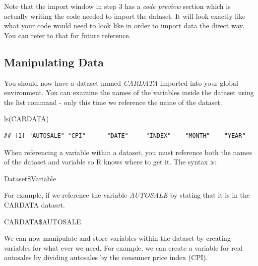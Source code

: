 \documentclass[
]{book}
\newenvironment{Shaded}{\begin{snugshade}}{\end{snugshade}}
\newcommand{\FunctionTok}[1]{\textcolor[rgb]{0.00,0.00,0.00}{#1}}
\newcommand{\NormalTok}[1]{#1}
\newcommand{\OtherTok}[1]{\textcolor[rgb]{0.56,0.35,0.01}{#1}}
\newcommand{\SpecialCharTok}[1]{\textcolor[rgb]{0.00,0.00,0.00}{#1}}
\begin{document}
Note that the import window in step 3 has a \emph{code preview} section which is actually writing the code needed to import the dataset. It will look exactly like what your code would need to look like in order to import data the direct way. You can refer to that for future reference.

\hypertarget{manipulating-data}{%
\subsection{Manipulating Data}\label{manipulating-data}}

You should now have a dataset named \emph{CARDATA} imported into your global environment. You can examine the names of the variables inside the dataset using the list command - only this time we reference the name of the dataset.

\begin{Shaded}
\begin{Highlighting}[]
\FunctionTok{ls}\NormalTok{(CARDATA)}
\end{Highlighting}
\end{Shaded}

\begin{verbatim}
## [1] "AUTOSALE" "CPI"      "DATE"     "INDEX"    "MONTH"    "YEAR"
\end{verbatim}

When referencing a variable within a dataset, you must reference both the names of the dataset and variable so R knows where to get it. The syntax is:

Dataset\$Variable

For example, if we reference the variable \emph{AUTOSALE} by stating that it is in the CARDATA dataset.

CARDATA\$AUTOSALE

We can now manipulate and store variables within the dataset by creating variables for what ever we need. For example, we can create a variable for real autosales by dividing autosales by the consumer price index (CPI).

\begin{Shaded}
\end{Shaded}
\end{document}

